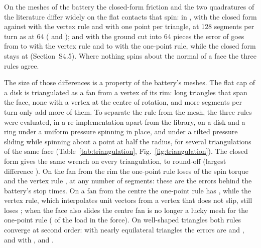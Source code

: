 On the meshes of the battery the closed-form friction and the two quadratures of the
literature differ widely on the flat contacts that spin: in ,
 with the closed form against  with the
vertex rule and  with one point per triangle, at 128 segments per
turn as at 64 ( and ); and
with the ground cut into 64 pieces the error of  goes from
 to  with the vertex rule and to
 with the one-point rule, while the closed form stays at
 (Section~S4.5). Where nothing spins about the normal of a
face the three rules agree.

The size of those differences is a property of the battery's meshes. The flat cap of a disk is
triangulated as a fan from a vertex of its rim: long triangles that span the face, none with a
vertex at the centre of rotation, and more segments per turn only add more of them. To separate
the rule from the mesh, the three rules were evaluated, in a re-implementation apart from the
library, on a disk and a ring under a uniform pressure spinning in place, and under a tilted
pressure sliding while spinning about a point at half the radius, for several triangulations of
the same face (Table~\ref{tab:triangulation}, Fig.~\ref{fig:triangulation}). The closed form
gives the same wrench on every triangulation, to round-off (largest difference
). On the fan from the rim the one-point rule loses
 of the spin torque and the vertex rule
, at any number of segments: these are the
errors behind the battery's stop times. On a fan from the centre the one-point rule has
, while the vertex rule, which interpolates
unit vectors from a vertex that does not slip, still loses
; when the face also slides the centre fan
is no longer a lucky mesh for the one-point rule
( of the load in the force). On
well-shaped triangles both rules converge at second order: with
 nearly equilateral triangles the errors are
 and ,
and with ,
 and .

